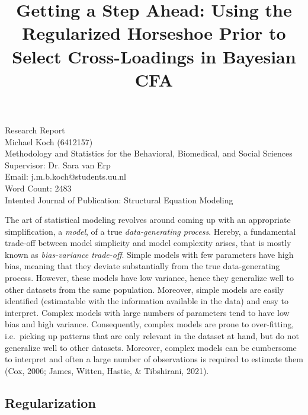 \documentclass[
  man,floatsintext]{apa6}
\title{Getting a Step Ahead: Using the Regularized Horseshoe Prior to Select Cross-Loadings in Bayesian CFA}
\author{\phantom{0}}
\date{}
\affiliation{\phantom{0}}
\begin{document}
\maketitle

\vfill
Research Report\\
Michael Koch (6412157)\\
Methodology and Statistics for the Behavioral, Biomedical, and Social Sciences \\
Supervisor: Dr. Sara van Erp \\ 
Email: j.m.b.koch@students.uu.nl \\
Word Count: 2483 \\
Intented Journal of Publication: Structural Equation Modeling \\

\setcounter{page}{0}
\thispagestyle{empty}
\pagestyle{plain}

\clearpage

The art of statistical modeling revolves around coming up with an appropriate simplification, a \emph{model}, of a true \emph{data-generating process}. Hereby, a fundamental trade-off between model simplicity and model complexity arises, that is mostly known as \emph{bias-variance trade-off}. Simple models with few parameters have high bias, meaning that they deviate substantially from the true data-generating process. However, these models have low variance, hence they generalize well to other datasets from the same population. Moreover, simple models are easily identified (estimatable with the information available in the data) and easy to interpret. Complex models with large numbers of parameters tend to have low bias and high variance. Consequently, complex models are prone to over-fitting, i.e.~picking up patterns that are only relevant in the dataset at hand, but do not generalize well to other datasets. Moreover, complex models can be cumbersome to interpret and often a large number of observations is required to estimate them (Cox, 2006; James, Witten, Hastie, \& Tibshirani, 2021).

\hypertarget{regularization}{%
\subsection{Regularization}\label{regularization}}
\end{document}
